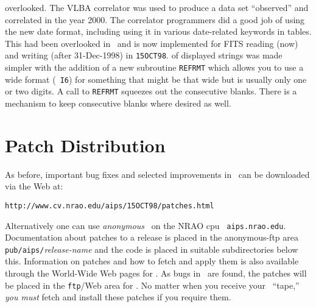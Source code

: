 \begin{description}
   overlooked.  The VLBA correlator was used to produce a data set
   ``observed'' and correlated in the year 2000.  The correlator
   programmers did a good job of using the new date format, including
   using it in various date-related keywords in tables.  This had been
   overlooked in \AIPS\ and is now implemented for FITS reading (now)
   and writing (after 31-Dec-1998) in \hbox{{\tt 15OCT98}}.
 \hspace{10pt} of displayed strings was made
   simpler with the addition of a new subroutine {\tt REFRMT} which
   allows you to use a wide format (\eg\ {\tt I6}) for something that
   might be that wide but is usually only one or two digits.  A call
   to {\tt REFRMT} squeezes out the consecutive blanks.  There is a
   mechanism to keep consecutive blanks where desired as well.
\end{description}

\section{Patch Distribution}

As before, important bug fixes and selected improvements in
\RELEASENAME\ can be downloaded via the Web at:

\begin{center}
\vskip -10pt
{\tt http://www.cv.nrao.edu/aips/15OCT98/patches.html}
\vskip -10pt
\end{center}

Alternatively one can use {\it anonymous} \ftp\ on the NRAO cpu {\tt
aips.nrao.edu}.  Documentation about patches to a release is placed
in the anonymous-ftp area {\tt pub/aips/}{\it release-name} and the
code is placed in suitable subdirectories below this. Information on
patches and how to fetch and apply them is also available through the
World-Wide Web pages for \hbox{\AIPS}.  As bugs in \RELEASENAME\ are
found, the patches will be placed in the {\tt ftp}/Web area for
\hbox{{\RELEASENAME}}.  No matter when you receive your \RELEASENAME\
``tape,'' {\it you must} fetch and install these patches if you
require them.

